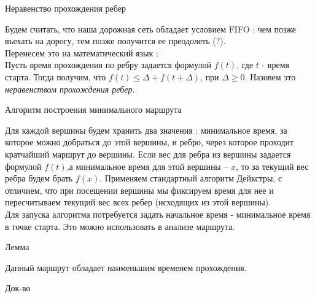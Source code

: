 \documentclass[12pt, a4paper]{article}
\begin{document}
$\textbf{Неравенство прохождения ребер}$

Будем считать, что наша дорожная сеть обладает условием FIFO : чем позже въехать на дорогу, тем позже получится ее преодолеть (?).\\
Перенесем это на математический язык : \\
Пусть время прохождения по ребру задается формулой $f(t)$, где $t$ - время старта. Тогда получим, что $f(t) \le \Delta + f(t + \Delta)$, при $\Delta \ge 0$. Назовем это \textit{неравенством прохождения ребер}.


$\textbf{Алгоритм построения минимального маршрута}$

Для каждой вершины будем хранить два значения : минимальное время, за которое можно добраться до этой вершины, и ребро, через которое проходит кратчайший маршрут до вершины.
Если вес для ребра из вершины задается формулой $f(t)$,а минимальное время для этой вершины -- $x$, то за текущий вес ребра будем брать $f(x)$.
Применяем стандартный алгоритм Дейкстры, с отличием, что при посещении вершины мы фиксируем время для нее и пересчитываем текущий вес всех ребер (исходящих из этой вершины).\\
Для запуска алгоритма потребуется задать начальное время - минимальное время в точке старта. Это можно использовать в анализе маршрута.

$\textbf{Лемма}$

Данный маршрут обладает наименьшим временем прохождения.

$\textit{Док-во}$
\end{document}
